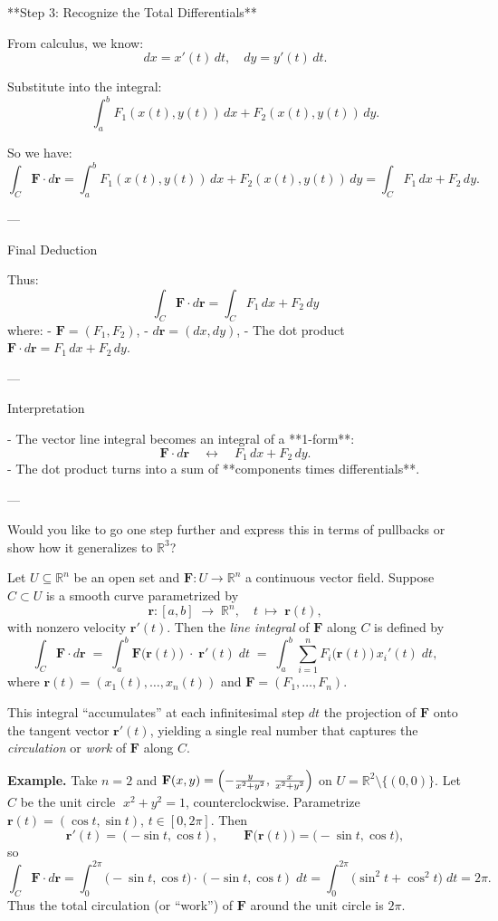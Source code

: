 \documentclass[11pt,openany]{article}
\renewcommand{\vec}[1]{\mathbf{#1}}
\begin{document}
 **Step 3: Recognize the Total Differentials**

From calculus, we know:
\[
dx = x'(t)\,dt, \quad dy = y'(t)\,dt.
\]

Substitute into the integral:
\[
\int_a^b F_1(x(t), y(t))\,dx + F_2(x(t), y(t))\,dy.
\]

So we have:
\[
\int_C \vec{F} \cdot d\vec{r}
= \int_a^b F_1(x(t), y(t))\,dx + F_2(x(t), y(t))\,dy
= \int_C F_1\,dx + F_2\,dy.
\]

---

Final Deduction

Thus:
\[
\boxed{
	\int_C \vec{F} \cdot d\vec{r}
	= \int_C F_1\,dx + F_2\,dy
}
\]
where:
- \( \vec{F} = (F_1, F_2) \),
- \( d\vec{r} = (dx, dy) \),
- The dot product \( \vec{F} \cdot d\vec{r} = F_1\,dx + F_2\,dy \).

---

 Interpretation

- The vector line integral becomes an integral of a **1-form**:  
\[
\vec{F} \cdot d\vec{r} \quad \leftrightarrow \quad F_1\,dx + F_2\,dy.
\]
- The dot product turns into a sum of **components times differentials**.

---

Would you like to go one step further and express this in terms of pullbacks or show how it generalizes to \( \mathbb{R}^3 \)?

\newpage
Let \(U\subseteq\mathbb{R}^n\) be an open set and 
\(\displaystyle\mathbf F:U\to\mathbb{R}^n\) a continuous vector field.  
Suppose \(C\subset U\) is a smooth curve parametrized by
\[
\mathbf r\colon [a,b]\;\longrightarrow\;\mathbb{R}^n,
\quad
t\;\mapsto\;\mathbf r(t),
\]
with nonzero velocity \(\mathbf r'(t)\).  Then the \emph{line integral} of \(\mathbf F\) along \(C\) is defined by
\[
\boxed{
	\int_C\mathbf F\!\cdot d\mathbf r
	\;=\;
	\int_a^b
	\mathbf F\bigl(\mathbf r(t)\bigr)\;\cdot\;\mathbf r'(t)\;dt
	\;=\;
	\int_a^b
	\sum_{i=1}^n F_i\bigl(\mathbf r(t)\bigr)\,x_i'(t)\;dt,
}
\]
where \(\mathbf r(t)=(x_1(t),\dots,x_n(t))\) and 
\(\mathbf F=(F_1,\dots,F_n)\).  

\medskip

\noindent
This integral “accumulates” at each infinitesimal step \(dt\) the projection of \(\mathbf F\) onto the tangent vector \(\mathbf r'(t)\), yielding a single real number that captures the \emph{circulation} or \emph{work} of \(\mathbf F\) along \(C\).

\bigskip

\noindent\textbf{Example.}  Take \(n=2\) and 
\(\displaystyle \mathbf F(x,y)
=\Bigl(-\tfrac{y}{x^2+y^2},\,\tfrac{x}{x^2+y^2}\Bigr)\)
on \(U=\mathbb{R}^2\setminus\{(0,0)\}\).  Let \(C\) be the unit circle 
\(\;x^2+y^2=1\), counterclockwise.  Parametrize
\(\mathbf r(t)=(\cos t,\sin t)\), \(t\in[0,2\pi]\).  Then
\[
\mathbf r'(t)=(-\sin t,\cos t),\qquad
\mathbf F\bigl(\mathbf r(t)\bigr)
=\bigl(-\sin t,\cos t\bigr),
\]
so
\[
\int_C\mathbf F\!\cdot d\mathbf r
=\int_0^{2\pi}
\bigl(-\sin t,\cos t\bigr)\cdot(-\sin t,\cos t)\;dt
=\int_0^{2\pi}
\bigl(\sin^2t+\cos^2t\bigr)\;dt
=2\pi.
\]
Thus the total circulation (or “work”) of \(\mathbf F\) around the unit circle is \(2\pi\).
\end{document}
